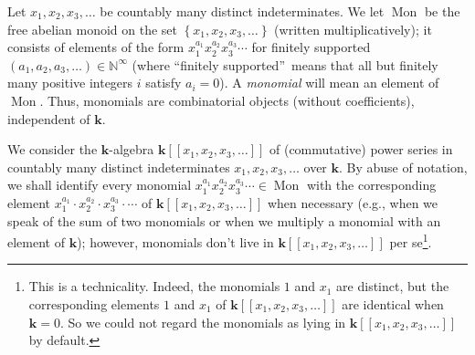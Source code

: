 \documentclass
[numbers=enddot,12pt,final,onecolumn,notitlepage,abstracton]{scrartcl}%
\theoremstyle{definition}
\begin{document}
Let $x_{1},x_{2},x_{3},\ldots$ be countably many distinct indeterminates. We
let $\operatorname*{Mon}$ be the free abelian monoid on the set $\left\{
x_{1},x_{2},x_{3},\ldots\right\}  $ (written multiplicatively); it consists of
elements of the form $x_{1}^{a_{1}}x_{2}^{a_{2}}x_{3}^{a_{3}}\cdots$ for
finitely supported $\left(  a_{1},a_{2},a_{3},\ldots\right)  \in
\mathbb{N}^{\infty}$ (where \textquotedblleft finitely
supported\textquotedblright\ means that all but finitely many positive
integers $i$ satisfy $a_{i}=0$). A \textit{monomial} will mean an element of
$\operatorname*{Mon}$. Thus, monomials are combinatorial objects (without
coefficients), independent of $\mathbf{k}$.

We consider the $\mathbf{k}$-algebra $\mathbf{k}\left[  \left[  x_{1}%
,x_{2},x_{3},\ldots\right]  \right]  $ of (commutative) power series in
countably many distinct indeterminates $x_{1},x_{2},x_{3},\ldots$ over
$\mathbf{k}$. By abuse of notation, we shall identify every monomial
$x_{1}^{a_{1}}x_{2}^{a_{2}}x_{3}^{a_{3}}\cdots\in\operatorname*{Mon}$ with the
corresponding element $x_{1}^{a_{1}}\cdot x_{2}^{a_{2}}\cdot x_{3}^{a_{3}%
}\cdot\cdots$ of $\mathbf{k}\left[  \left[  x_{1},x_{2},x_{3},\ldots\right]
\right]  $ when necessary (e.g., when we speak of the sum of two monomials or
when we multiply a monomial with an element of $\mathbf{k}$); however,
monomials don't live in $\mathbf{k}\left[  \left[  x_{1},x_{2},x_{3}%
,\ldots\right]  \right]  $ per se\footnote{This is a technicality. Indeed, the
monomials $1$ and $x_{1}$ are distinct, but the corresponding elements $1$ and
$x_{1}$ of $\mathbf{k}\left[  \left[  x_{1},x_{2},x_{3},\ldots\right]
\right]  $ are identical when $\mathbf{k}=0$. So we could not regard the
monomials as lying in $\mathbf{k}\left[  \left[  x_{1},x_{2},x_{3}%
,\ldots\right]  \right]  $ by default.}.
\end{document}
